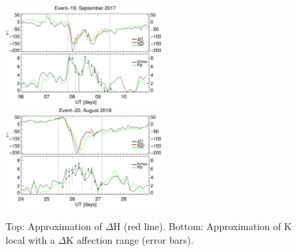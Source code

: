 \documentclass[a4paper,fleqn]{cas-dc}
\begin{document}
\begin{figure}[h!]
       \centerline{\Large \bf   
      \hspace{0.275\textwidth}  \color{black}{}
       \hspace{0.295\textwidth}  \color{black}{}
         \hfill}
       \includegraphics[width=6.0cm]{images/dH_approx/diono_valid_V4_2017-09-06.eps}     
       \includegraphics[width=6.0cm]{images/dH_approx/diono_valid_V4_2018-08-24.eps}
       
       \caption{Top: Approximation of $\Delta$H (red line). Bottom: Approximation of K local with a $\Delta$K affection range (error bars).}
    \label{fig:iono_valid3}
\end{figure}
\end{document}
